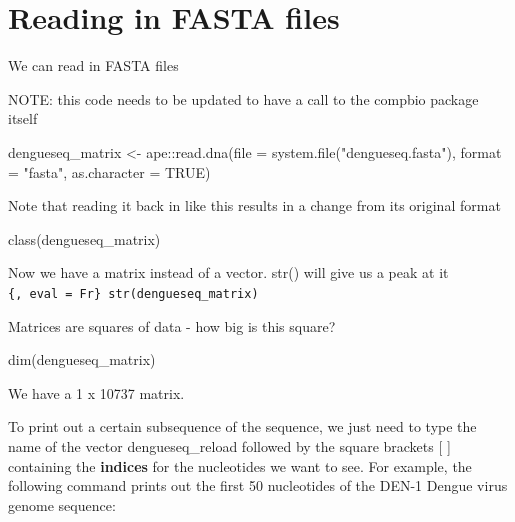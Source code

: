 \documentclass[
]{book}
\newenvironment{Shaded}{\begin{snugshade}}{\end{snugshade}}
\newcommand{\AttributeTok}[1]{\textcolor[rgb]{0.77,0.63,0.00}{#1}}
\newcommand{\ConstantTok}[1]{\textcolor[rgb]{0.00,0.00,0.00}{#1}}
\newcommand{\FunctionTok}[1]{\textcolor[rgb]{0.00,0.00,0.00}{#1}}
\newcommand{\NormalTok}[1]{#1}
\newcommand{\OtherTok}[1]{\textcolor[rgb]{0.56,0.35,0.01}{#1}}
\newcommand{\SpecialCharTok}[1]{\textcolor[rgb]{0.00,0.00,0.00}{#1}}
\newcommand{\StringTok}[1]{\textcolor[rgb]{0.31,0.60,0.02}{#1}}
\begin{document}
\hypertarget{reading-in-fasta-files}{%
\section{Reading in FASTA files}\label{reading-in-fasta-files}}

We can read in FASTA files

NOTE: this code needs to be updated to have a call to the compbio package itself

\begin{Shaded}
\begin{Highlighting}[]
\NormalTok{dengueseq\_matrix }\OtherTok{\textless{}{-}}\NormalTok{ ape}\SpecialCharTok{::}\FunctionTok{read.dna}\NormalTok{(}\AttributeTok{file =} \FunctionTok{system.file}\NormalTok{(}\StringTok{"dengueseq.fasta"}\NormalTok{),}
              \AttributeTok{format =} \StringTok{"fasta"}\NormalTok{,}
              \AttributeTok{as.character =} \ConstantTok{TRUE}\NormalTok{)}
\end{Highlighting}
\end{Shaded}

Note that reading it back in like this results in a change from its original format

\begin{Shaded}
\begin{Highlighting}[]
\FunctionTok{class}\NormalTok{(dengueseq\_matrix)}
\end{Highlighting}
\end{Shaded}

Now we have a matrix instead of a vector. str() will give us a peak at it
\texttt{\{,\ eval\ =\ Fr\}\ str(dengueseq\_matrix)}

Matrices are squares of data - how big is this square?

\begin{Shaded}
\begin{Highlighting}[]
\FunctionTok{dim}\NormalTok{(dengueseq\_matrix)}
\end{Highlighting}
\end{Shaded}

We have a 1 x 10737 matrix.

To print out a certain subsequence of the sequence, we just need to type the name of the vector dengueseq\_reload followed by the square brackets {[} {]} containing the \textbf{indices} for the nucleotides we want to see. For example, the following command prints out the first 50 nucleotides of the DEN-1 Dengue virus genome sequence:
\end{document}
